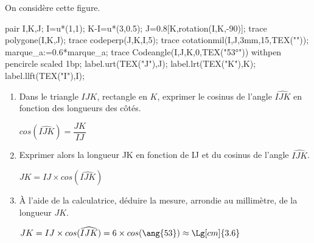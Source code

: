     On considère cette figure.

    \begin{Geometrie}
        pair I,K,J;
        I=u*(1,1);
        K-I=u*(3,0.5);
        J=0.8[K,rotation(I,K,-90)];
        trace polygone(I,K,J);
        trace codeperp(J,K,I,5);
        trace cotationmil(I,J,3mm,15,TEX(""));
        marque_a:=0.6*marque_a;
        trace Codeangle(I,J,K,0,TEX("\ang{53}")) withpen pencircle scaled 1bp;
        label.urt(TEX("J"),J);
        label.lrt(TEX("K"),K);
        label.llft(TEX("I"),I);
    \end{Geometrie}

    \begin{enumerate}
        \item Dans le triangle $IJK$, rectangle en $K$, exprimer le cosinus de l'angle $\widehat{IJK}$ en fonction des longueurs des côtés.

        {\color{red} $cos(\widehat{IJK})=\dfrac{JK}{IJ}$}
        \item Exprimer alors la longueur JK en fonction de IJ et du cosinus de l'angle $\widehat{IJK}$.

        {\color{red} $JK=IJ\times cos(\widehat{IJK})$}
        \item À l'aide de la calculatrice, déduire la mesure, arrondie au millimètre, de la longueur $JK$.

        {\color{red} $JK=IJ\times cos(\widehat{IJK})=6\times cos(\ang{53})\approx\Lg[cm]{3.6}$}
    \end{enumerate}
